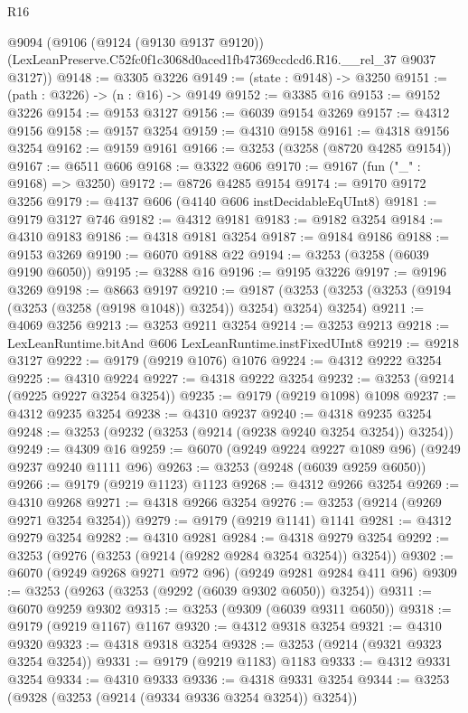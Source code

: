 \begin{lexlean}{R16}
\begin{coremodule}
  @9094
    (@9106
      (@9124 (@9130 @9137 @9120))
      (LexLeanPreserve.C52fc0f1c3068d0aced1fb47369ccdcd6.R16.__rel_37 @9037 @3127))
@9148 := @3305 @3226
@9149 := (state : @9148) -> @3250
@9151 := (path : @3226) -> (n : @16) -> @9149
@9152 := @3385 @16
@9153 := @9152 @3226
@9154 := @9153 @3127
@9156 := @6039 @9154 @3269
@9157 := @4312 @9156
@9158 := @9157 @3254
@9159 := @4310 @9158
@9161 := @4318 @9156 @3254
@9162 := @9159 @9161
@9166 := @3253 (@3258 (@8720 @4285 @9154))
@9167 := @6511 @606
@9168 := @3322 @606
@9170 := @9167 (fun ("_" : @9168) => @3250)
@9172 := @8726 @4285 @9154
@9174 := @9170 @9172 @3256
@9179 := @4137 @606 (@4140 @606 instDecidableEqUInt8)
@9181 := @9179 @3127 @746
@9182 := @4312 @9181
@9183 := @9182 @3254
@9184 := @4310 @9183
@9186 := @4318 @9181 @3254
@9187 := @9184 @9186
@9188 := @9153 @3269
@9190 := @6070 @9188 @22
@9194 := @3253 (@3258 (@6039 @9190 @6050))
@9195 := @3288 @16
@9196 := @9195 @3226
@9197 := @9196 @3269
@9198 := @8663 @9197
@9210 := @9187 (@3253 (@3253 (@3253 (@9194 (@3253 (@3258 (@9198 @1048)) @3254)) @3254) @3254) @3254)
@9211 := @4069 @3256
@9213 := @3253 @9211 @3254
@9214 := @3253 @9213
@9218 := LexLeanRuntime.bitAnd @606 LexLeanRuntime.instFixedUInt8
@9219 := @9218 @3127
@9222 := @9179 (@9219 @1076) @1076
@9224 := @4312 @9222 @3254
@9225 := @4310 @9224
@9227 := @4318 @9222 @3254
@9232 := @3253 (@9214 (@9225 @9227 @3254 @3254))
@9235 := @9179 (@9219 @1098) @1098
@9237 := @4312 @9235 @3254
@9238 := @4310 @9237
@9240 := @4318 @9235 @3254
@9248 := @3253 (@9232 (@3253 (@9214 (@9238 @9240 @3254 @3254)) @3254))
@9249 := @4309 @16
@9259 := @6070 (@9249 @9224 @9227 @1089 @96) (@9249 @9237 @9240 @1111 @96)
@9263 := @3253 (@9248 (@6039 @9259 @6050))
@9266 := @9179 (@9219 @1123) @1123
@9268 := @4312 @9266 @3254
@9269 := @4310 @9268
@9271 := @4318 @9266 @3254
@9276 := @3253 (@9214 (@9269 @9271 @3254 @3254))
@9279 := @9179 (@9219 @1141) @1141
@9281 := @4312 @9279 @3254
@9282 := @4310 @9281
@9284 := @4318 @9279 @3254
@9292 := @3253 (@9276 (@3253 (@9214 (@9282 @9284 @3254 @3254)) @3254))
@9302 := @6070 (@9249 @9268 @9271 @972 @96) (@9249 @9281 @9284 @411 @96)
@9309 := @3253 (@9263 (@3253 (@9292 (@6039 @9302 @6050)) @3254))
@9311 := @6070 @9259 @9302
@9315 := @3253 (@9309 (@6039 @9311 @6050))
@9318 := @9179 (@9219 @1167) @1167
@9320 := @4312 @9318 @3254
@9321 := @4310 @9320
@9323 := @4318 @9318 @3254
@9328 := @3253 (@9214 (@9321 @9323 @3254 @3254))
@9331 := @9179 (@9219 @1183) @1183
@9333 := @4312 @9331 @3254
@9334 := @4310 @9333
@9336 := @4318 @9331 @3254
@9344 := @3253 (@9328 (@3253 (@9214 (@9334 @9336 @3254 @3254)) @3254))

\end{coremodule}
\end{lexlean}
